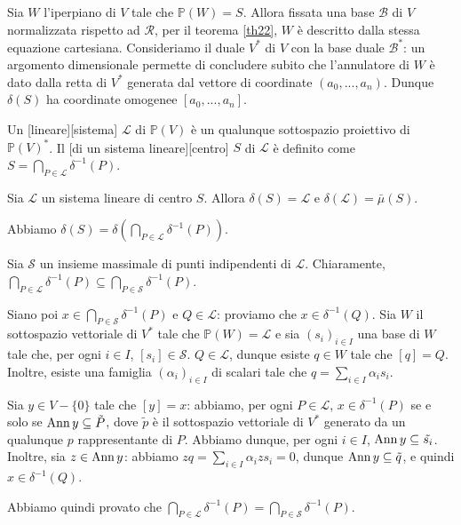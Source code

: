 \Proof Sia $W$ l'iperpiano di $V$ tale che $\mathbb{P}(W) = S$. Allora fissata una base $\mathcal{B}$ di $V$ normalizzata rispetto ad $\mathcal{R}$, per il teorema \ref{th22}, $W$ \`e descritto dalla stessa equazione cartesiana. Consideriamo il duale $V^*$ di $V$ con la base duale $\mathcal{B}^*$: un argomento dimensionale permette di concludere subito che l'annulatore di $W$ \`e dato dalla retta di $V^*$ generata dal vettore di coordinate $(a_0, ..., a_n)$. Dunque $\delta(S)$ ha coordinate omogenee $[a_0, ..., a_n]$. \EndProof
\begin{Definition}\label{def29}
	Un [lineare][sistema] $\mathcal{L}$ di $\mathbb{P}(V)$ \`e un qualunque sottospazio proiettivo di $\mathbb{P}(V)^*$. Il [di un sistema lineare][centro] $S$ di $\mathcal{L}$ \`e definito come $S = \bigcap_{P \in \mathcal{L}} \delta^{-1}(P)$.
\end{Definition}
\begin{Lemma}\label{Lemma1}
	Sia $\mathcal{L}$ un sistema lineare di centro $S$. Allora $\delta(S) = \mathcal{L}$ e $\delta(\mathcal{L}) = \bar{\mu}(S)$.
\end{Lemma}
\Proof Abbiamo $\delta(S) = \delta(\bigcap_{P \in \mathcal{L}} \delta^{-1}(P))$.
\par Sia $\mathcal{S}$ un insieme massimale di punti indipendenti di $\mathcal{L}$. Chiaramente, $\bigcap_{P \in \mathcal{L}} \delta^{-1}(P) \subseteq \bigcap_{P \in \mathcal{S}} \delta^{-1}(P)$.
\par Siano poi $x \in \bigcap_{P \in \mathcal{S}} \delta^{-1}(P)$ e $Q \in \mathcal{L}$: proviamo che $x \in \delta^{-1}(Q)$. Sia $W$ il sottospazio vettoriale di $V^*$ tale che $\mathbb{P}(W) = \mathcal{L}$ e sia $(s_i)_{i \in I}$ una base di $W$ tale che, per ogni $i \in I$, $[s_i] \in \mathcal{S}$. $Q \in \mathcal{L}$, dunque esiste $q \in W$ tale che $[q] = Q$. Inoltre, esiste una famiglia $(\alpha_i)_{i \in I}$ di scalari tale che $q = \sum_{i \in I} \alpha_i s_i$.
\par Sia $y \in V - \lbrace 0 \rbrace$ tale che $[y] = x$: abbiamo, per ogni $P \in \mathcal{L}$, $x \in \delta^{-1}(P)$ se e solo se $\operatorname{Ann} {y} \subseteq \tilde{P}$, dove $\tilde{p}$ \`e il sottospazio vettoriale di $V^*$ generato da un qualunque $p$ rappresentante di $P$. Abbiamo dunque, per ogni $i \in I$, $\operatorname{Ann} {y} \subseteq \tilde{s_i}$. Inoltre, sia $z \in \operatorname{Ann} {y}$: abbiamo $zq = \sum_{i \in I} \alpha_i zs_i = 0$, dunque $\operatorname{Ann} {y} \subseteq \tilde{q}$, e quindi $x \in \delta^{-1}(Q)$.
\par Abbiamo quindi provato che $\bigcap_{P \in \mathcal{L}} \delta^{-1}(P) = \bigcap_{P \in \mathcal{S}} \delta^{-1}(P)$.
